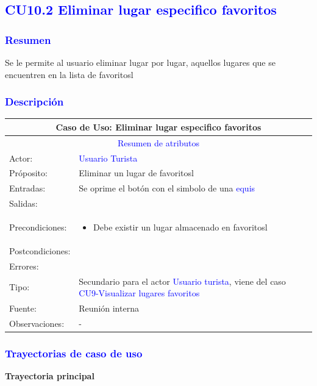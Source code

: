 
\pagebreak
\subsection{\textcolor{blue}{CU10.2 Eliminar lugar especifico favoritos}}
\subsubsection{\textcolor{blue}{Resumen}}
 Se le permite al usuario eliminar lugar por lugar, aquellos lugares que se encuentren en la lista de favoritosl
\subsubsection{\textcolor{blue}{Descripción}}
\begin{tabularx}{16cm}{||l|X||}
	\hline
	\multicolumn{2}{||c||}{Caso de Uso: Eliminar lugar especifico favoritos} \\
	\hline
	\multicolumn{2}{||c||}{\textcolor{blue}{Resumen de atributos}} \\
	\hline
	{Actor:} & {\textcolor{blue}{Usuario Turista}} \\
	\hline
	{Próposito:} & {Eliminar un lugar de favoritosl} \\
	\hline
	{Entradas:} & {Se oprime el botón con el simbolo de una \textcolor{blue}{equis}}\\
	\hline
	{Salidas:} & {}\\
	\hline
	{Precondiciones:} & {\begin{itemize}
	    \item Debe existir un lugar almacenado en favoritosl
	\end{itemize}}\\ 
	\hline
	{Postcondiciones:} & {}\\
	\hline
	{Errores:} & {} \\
	\hline
	{Tipo:} & {Secundario para el actor \textcolor{blue}{Usuario turista}, viene del caso \textcolor{blue}{CU9-Visualizar lugares favoritos}}\\
	\hline
	{Fuente:} & {Reunión interna} \\
	\hline
	{Observaciones:} & {-} \\
	\hline
\end{tabularx}

\pagebreak
\subsubsection{\textcolor{blue}{Trayectorias de caso de uso}}
\textbf{Trayectoria principal}
    
